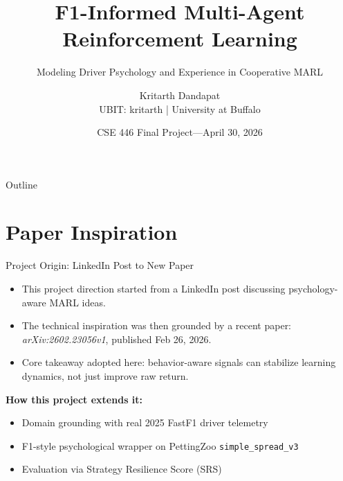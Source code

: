 \documentclass[10pt,aspectratio=169]{beamer}
\title{F1-Informed Multi-Agent\\Reinforcement Learning}
\subtitle{Modeling Driver Psychology and Experience in Cooperative MARL}
\author{Kritarth Dandapat \\ \small UBIT: kritarth \;|\; University at Buffalo}
\date{CSE 446 Final Project\;---\;April 30, 2026}
\institute{}
\begin{document}

{
\begin{frame}[plain]
  \vspace{-0.4cm}
  \maketitle
\end{frame}
}

\begin{frame}{Outline}
  \tableofcontents
\end{frame}

\section{Paper Inspiration}

\begin{frame}{Project Origin: LinkedIn Post to New Paper}
  \small
  \begin{itemize}
    \item This project direction started from a LinkedIn post discussing
          psychology-aware MARL ideas.
    \item The technical inspiration was then grounded by a recent paper:
          \textit{arXiv:2602.23056v1}, published Feb 26, 2026.
    \item Core takeaway adopted here: behavior-aware signals can stabilize
          learning dynamics, not just improve raw return.
  \end{itemize}

  \smallskip
  \textbf{How this project extends it:}
  \begin{itemize}
    \item Domain grounding with real 2025 FastF1 driver telemetry
    \item F1-style psychological wrapper on PettingZoo \texttt{simple\_spread\_v3}
    \item Evaluation via Strategy Resilience Score (SRS)
  \end{itemize}
\end{frame}
\end{document}
